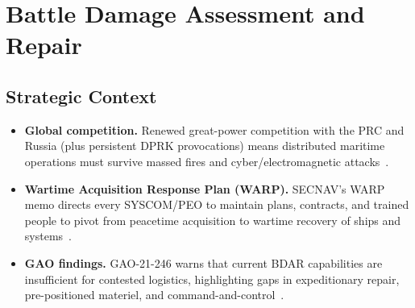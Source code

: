 \documentclass[../main.tex]{subfiles}
\begin{document}
\section{Battle Damage Assessment and Repair}
\minibib

\subsection{Strategic Context}
\begin{itemize}
\item \textbf{Global competition.} Renewed great-power competition with the PRC and Russia (plus persistent DPRK provocations) means distributed maritime operations must survive massed fires and cyber/electromagnetic attacks~\autocite{NAVPLAN2024,edo-4-1-6-bdar-2025}.
\item \textbf{Wartime Acquisition Response Plan (WARP).} SECNAV's WARP memo directs every SYSCOM/PEO to maintain plans, contracts, and trained people to pivot from peacetime acquisition to wartime recovery of ships and systems~\autocite{SECNAV-WARP-2021}.
\item \textbf{GAO findings.} GAO-21-246 warns that current BDAR capabilities are insufficient for contested logistics, highlighting gaps in expeditionary repair, pre-positioned materiel, and command-and-control~\autocite{GAO-21-246}.
\end{itemize}
\end{document}
